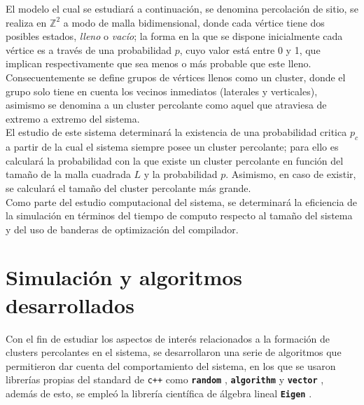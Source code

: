 \documentclass[11pt,twocolumn]{article}
\begin{document}
El modelo el cual se estudiará a continuación, se denomina percolación de sitio, se realiza en $\mathbb{Z}^{2}$ a modo de malla bidimensional, donde cada vértice tiene dos posibles estados, \textit{lleno} o \textit{vacío}; la forma en la que se dispone inicialmente cada vértice es a través de una probabilidad $p$, cuyo valor está entre 0 y 1, que implican respectivamente que sea menos o más probable que este lleno.\cite{percosite} \\
Consecuentemente se define grupos de vértices llenos como un cluster, donde el grupo solo tiene en cuenta los vecinos inmediatos (laterales y verticales), asimismo se denomina a un cluster percolante como aquel que atraviesa de extremo a extremo del sistema. \\
El estudio de este sistema determinará la existencia de una probabilidad critica $p_c$ a partir de la cual el sistema siempre posee un cluster percolante; para ello es calculará la probabilidad con la que existe un cluster percolante en función del tamaño de la malla cuadrada $L$ y la probabilidad $p$. Asimismo, en caso  de existir, se calculará el tamaño del cluster percolante más grande. \\
Como parte del estudio computacional del sistema, se determinará la eficiencia de la simulación en términos del tiempo de computo respecto al tamaño del sistema y del uso de banderas de optimización del compilador.



\section{\textbf{Simulación y algoritmos desarrollados}}

\label{sec:algoritmos}

Con el fin de estudiar los aspectos de interés relacionados a la formación de clusters percolantes en el sistema, se desarrollaron una serie de algoritmos que permitieron dar cuenta del comportamiento del sistema, en los que se usaron librerías propias del standard de \texttt{c++} como \textbf{\texttt{random}} \cite{random}, \texttt{\textbf{algorithm}} \cite{algorithm} y \texttt{\textbf{vector}} \cite{vector}, además de esto, se empleó la librería científica de álgebra lineal \texttt{\textbf{Eigen}} \cite{eigen}.
\vspace{0.2 cm}
\end{document}
